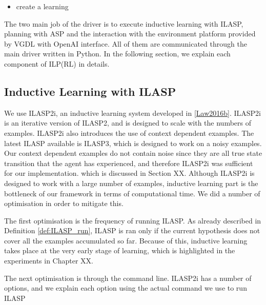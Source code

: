 \begin{itemize}
    \item create a learning
\end{itemize}
The two main job of the driver is to execute inductive learning with ILASP, planning with ASP and the interaction with the environment platform provided by VGDL with OpenAI interface.
All of them are communicated through the main driver written in Python. 
In the following section, we explain each component of ILP(RL) in details.




\subsection{Inductive Learning with ILASP}
We use ILASP2i, an inductive learning system developed in \ref{Law2016b}.
ILASP2i is an iterative version of ILASP2, and is designed to scale with the numbers of examples. 
ILASP2i also introduces the use of context dependent examples.
The latest ILASP available is ILASP3, which is designed to work on a noisy examples. Our context dependent examples do not contain noise since they are all true state transition that the agent has experienced, and therefore ILASP2i was sufficient for our implementation.
which is discussed in Section XX. 
Although ILASP2i is designed to work with a large number of examples, inductive learning part is the bottleneck of our framework in terms of computational time. 
We did a number of optimisation in order to mitigate this. 

The first optimisation is the frequency of running ILASP. 
As already described in Definition \ref{def:ILASP_run}, ILASP is ran only if the current hypothesis does not cover all the examples accumulated so far.
Because of this, inductive learning takes place at the very early stage of learning, which is highlighted in the experiments in Chapter XX. 

The next optimisation is through the command line. 
ILASP2i has a number of options, and we explain each option using the actual command we use to run ILASP

